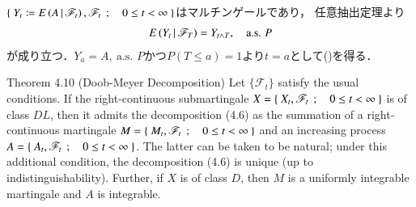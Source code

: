 	\begin{prf}
		$\left\{\ Y_t \coloneqq E\left( A \, \middle|\, \mathscr{F}_t \right),\mathscr{F}_t\ \, ; \quad 0 \leq t < \infty\ \right\}$はマルチンゲールであり，
		任意抽出定理より
		\begin{align}
			E\left( Y_t \, \middle|\, \mathscr{F}_T \right) = Y_{t \wedge T},
			\quad \mbox{a.s. $P$}
		\end{align}
		が成り立つ．$Y_a = A,\ \mbox{a.s. $P$}$かつ$P(T \leq a)=1$より$t=a$として()を得る．
		\QED
	\end{prf}
	
	\begin{itembox}[l]{Theorem 4.10 (Doob-Meyer Decomposition)}
		Let $\{\mathscr{F}_t\}$ satisfy the usual conditions. If the right-continuous
		submartingale $X = \left\{\ X_t,\mathscr{F}_t\ \, ; \quad 0 \leq t < \infty\ \right\}$ is of class $DL$, then it admits
		the decomposition (4.6) as the summation of a right-continuous martingale $M = \left\{\ M_t,\mathscr{F}_t\ \, ; \quad 0 \leq t < \infty\ \right\}$
		and an increasing process $A = \left\{\ A_t,\mathscr{F}_t\ \, ; \quad 0 \leq t < \infty\ \right\}$. The latter can be taken to be natural;
		under this additional condition, the decomposition (4.6) is unique (up to indistinguishability).
		Further, if $X$ is of class $D$, then $M$ is a uniformly integrable martingale and $A$ is integrable.	
	\end{itembox}
	
